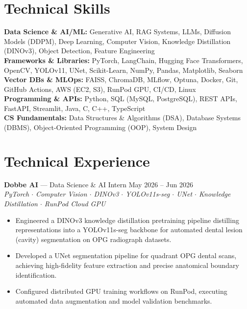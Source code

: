 \documentclass[a4paper,10pt]{article}
\begin{document}
\section*{Technical Skills}
\textbf{Data Science \& AI/ML:} Generative AI, RAG Systems, LLMs, Diffusion Models (DDPM), Deep Learning, Computer Vision, Knowledge Distillation (DINOv3), Object Detection, Feature Engineering\\
\textbf{Frameworks \& Libraries:} PyTorch, LangChain, Hugging Face Transformers, OpenCV, YOLOv11, UNet, Scikit-Learn, NumPy, Pandas, Matplotlib, Seaborn\\
\textbf{Vector DBs \& MLOps:} FAISS, ChromaDB, MLflow, Optuna, Docker, Git, GitHub Actions, AWS (EC2, S3), RunPod GPU, CI/CD, Linux\\
\textbf{Programming \& APIs:} Python, SQL (MySQL, PostgreSQL), REST APIs, FastAPI, Streamlit, Java, C, C++, TypeScript\\
\textbf{CS Fundamentals:} Data Structures \& Algorithms (DSA), Database Systems (DBMS), Object-Oriented Programming (OOP), System Design


\section*{Technical Experience}

\textbf{Dobbe AI} --- Data Science \& AI Intern \hfill May 2026 -- Jun 2026\\
\textit{PyTorch $\cdot$ Computer Vision $\cdot$ DINOv3 $\cdot$ YOLOv11s-seg $\cdot$ UNet $\cdot$ Knowledge Distillation $\cdot$ RunPod Cloud GPU}
\begin{itemize}[leftmargin=*,noitemsep,topsep=1pt,parsep=0pt,partopsep=0pt,itemsep=1pt]
\item Engineered a DINOv3 knowledge distillation pretraining pipeline distilling representations into a YOLOv11s-seg backbone for automated dental lesion (cavity) segmentation on OPG radiograph datasets.
\item Developed a UNet segmentation pipeline for quadrant OPG dental scans, achieving high-fidelity feature extraction and precise anatomical boundary identification.
\item Configured distributed GPU training workflows on RunPod, executing automated data augmentation and model validation benchmarks.
\end{itemize}
\end{document}
